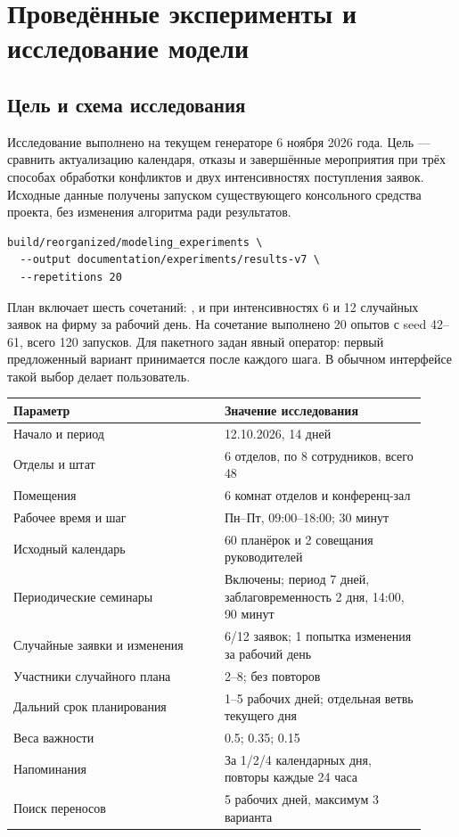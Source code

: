 \section{Проведённые эксперименты и исследование модели}
\subsection{Цель и схема исследования}
Исследование выполнено на текущем генераторе  6 ноября 2026 года. Цель --- сравнить актуализацию календаря, отказы и завершённые мероприятия при трёх способах обработки конфликтов и двух интенсивностях поступления заявок. Исходные данные получены запуском существующего консольного средства проекта, без изменения алгоритма ради результатов.
\begin{lstlisting}
build/reorganized/modeling_experiments \
  --output documentation/experiments/results-v7 \
  --repetitions 20
\end{lstlisting}

План включает шесть сочетаний: ,  и  при интенсивностях 6 и 12 случайных заявок на фирму за рабочий день. На сочетание выполнено 20 опытов с seed 42--61, всего 120 запусков. Для пакетного  задан явный оператор: первый предложенный вариант принимается после каждого шага. В обычном интерфейсе такой выбор делает пользователь.

\begin{longtable}{L{0.47\linewidth}L{0.45\linewidth}}
\toprule Параметр & Значение исследования \\\midrule\endhead
Начало и период & 12.10.2026, 14 дней \\
Отделы и штат & 6 отделов, по 8 сотрудников, всего 48 \\
Помещения & 6 комнат отделов и конференц-зал \\
Рабочее время и шаг & Пн--Пт, 09:00--18:00; 30 минут \\
Исходный календарь & 60 планёрок и 2 совещания руководителей \\
Периодические семинары & Включены; период 7 дней, заблаговременность 2 дня, 14:00, 90 минут \\
Случайные заявки и изменения & 6/12 заявок; 1 попытка изменения за рабочий день \\
Участники случайного плана & 2--8; без повторов \\
Дальний срок планирования & 1--5 рабочих дней; отдельная ветвь текущего дня \\
Веса важности & 0.5; 0.35; 0.15 \\
Напоминания & За 1/2/4 календарных дня, повторы каждые 24 часа \\
Поиск переносов & 5 рабочих дней, максимум 3 варианта \\
\bottomrule
\end{longtable}

